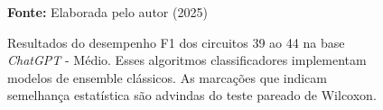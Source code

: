 \begin{figure}
\caption{Resultados do desempenho F1 dos circuitos 39 ao 44 na base \textit{ChatGPT} - Médio. Esses algoritmos classificadores implementam modelos de ensemble clássicos. As marcações que indicam semelhança estatística são advindas do teste pareado de Wilcoxon.}
\label{fig:f1:medium:g8}
     \centering
    \centering

      \par\medskip\ABNTEXfontereduzida\selectfont\textbf{Fonte:} Elaborada pelo autor (2025) \par\medskip
\end{figure}